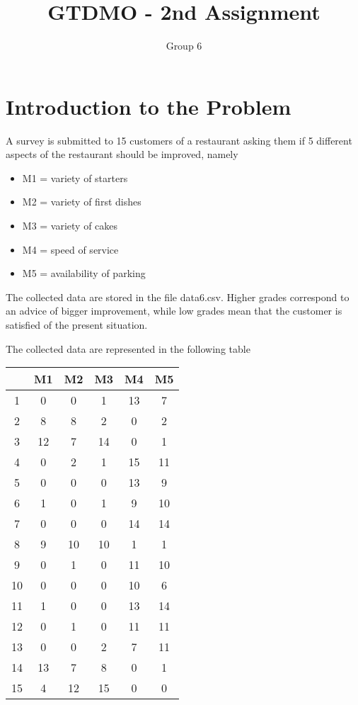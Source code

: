 \documentclass[10pt]{article}
\title{\textbf{GTDMO - 2nd Assignment}}
\author{Group 6}
\theoremstyle{plain}
\theoremstyle{definition}
\begin{document}
\maketitle 

\section{Introduction to the Problem}

A survey is submitted to 15 customers of a restaurant asking them if 5 different aspects of the restaurant should be improved, namely
\begin{itemize}

\item  M1 = variety of starters
\item  M2 = variety of first dishes
\item  M3 = variety of cakes
\item  M4 = speed of service
\item  M5 = availability of parking
\end{itemize}
The collected data are stored in the file data6.csv. Higher grades correspond to an advice of bigger improvement, while low grades mean that the customer is satisfied of the present situation.

The collected data are represented in the following table
\begin{center}
 \begin{tabular}{|c c c c c c|} 
 \hline
  & M1 & M2 & M3 & M4 & M5 \\ [0.5ex] 
 \hline\hline
 1 & 0 & 0 & 1 & 13 & 7 \\ 
 \hline
2&	8&	8&	2&	0&	2 \\
\hline
3&	12&	7&	14	&0&	1\\
\hline
4&	0&	2&	1&	15&	11\\
\hline
5&	0&	0&	0&	13&	9\\
\hline
6&	1&	0&	1&	9&	10\\
\hline
7&	0&	0&	0&	14&	14\\
\hline
8&	9&	10&	10&	1&	1\\
\hline
9&	0&	1&	0&	11&	10\\
\hline
10&	0&	0&	0&	10&	6\\
\hline
11&	1&	0&	0&	13&	14\\
\hline
12&	0&	1&	0&	11&	11\\
\hline
13&	0&	0&	2&	7&	11\\
\hline
14&	13&	7&	8&	0&	1\\
\hline
15&	4&	12&	15&	0&	0\\[1ex] 
 \hline
\end{tabular}
\end{center}
\end{document}
